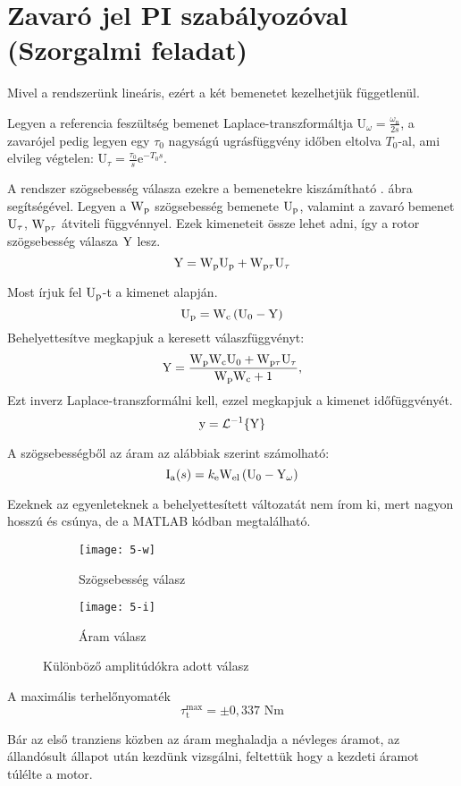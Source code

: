 \section{Zavaró jel PI szabályozóval (Szorgalmi feladat)}\label{sec:szorg-pi}

Mivel a rendszerünk lineáris, ezért a két bemenetet kezelhetjük függetlenül.

Legyen a referencia feszültség bemenet Laplace-transzformáltja
$\mathrm{U}_\omega = \frac{\omega_\text{n}}{2s}$,
a zavarójel pedig legyen egy $\tau_0$ nagyságú ugrásfüggvény időben eltolva $T_0$-al,
ami elvileg végtelen: $\mathrm{U}_\tau=\frac{\tau_0}{s}\text{e}^{-T_0s}$.

A rendszer szögsebesség válasza ezekre a bemenetekre kiszámítható .
ábra segítségével.
Legyen a $\mathrm{W}_\text{p}$ szögsebesség bemenete $\mathrm{U}_\text{p}$, valamint a 
zavaró bemenet $\mathrm{U}_\tau$, $\mathrm{W}_{\text{p}\tau}$ átviteli függvénnyel.
Ezek kimeneteit össze lehet adni, így a rotor szögsebesség válasza $\mathrm{Y}$ lesz.
\begin{equation}
	\mathrm{Y} = \mathrm{W}_\text{p}\mathrm{U}_\text{p} + \mathrm{W}_{\text{p}\tau}\mathrm{U}_\tau
\end{equation}

Most írjuk fel $\mathrm{U}_\text{p}$-t a kimenet alapján.
\begin{equation}
	\mathrm{U}_\text{p} = \mathrm{W}_\text{c}\left(\mathrm{U}_0 - \mathrm{Y}\right)
\end{equation}
%
Behelyettesítve megkapjuk a keresett válaszfüggvényt:
\begin{equation}
	\mathrm{Y} = \frac{\mathrm{W}_\text{p}\mathrm{W}_\text{c}\mathrm{U}_0 + \mathrm{W}_{\text{p}\tau}\mathrm{U}_\tau}{\mathrm{W}_\text{p}\mathrm{W}_\text{c} +1},
\end{equation}
%
Ezt inverz Laplace-transzformálni kell, ezzel megkapjuk a kimenet időfüggvényét.
\begin{equation}
	\mathrm{y} = \mathcal{L}^{-1}\{\mathrm{Y}\}
\end{equation}

A szögsebességből az áram az alábbiak szerint számolható:
\begin{equation}
	\mathrm{I}_\text{a}(s) = k_\text{e}\mathrm{W}_\text{el}\left(\mathrm{U}_0 - \mathrm{Y}_\omega\right)
\end{equation}

Ezeknek az egyenleteknek a behelyettesített változatát nem írom ki, mert
nagyon hosszú és csúnya, de a MATLAB kódban megtalálható.

\begin{figure}[H]
	\centering
	\begin{subfigure}{.49\textwidth}
		\texttt{[image: 5-w]}
		\caption{Szögsebesség válasz}
	\end{subfigure}
	\begin{subfigure}{.49\textwidth}
		\texttt{[image: 5-i]}
		\caption{Áram válasz}
	\end{subfigure}
	\caption{Különböző amplitúdókra adott válasz}
	\label{fig:szorg1}
\end{figure}

A maximális terhelőnyomaték
\begin{equation}
	\tau_\text{t}^\text{max} = \pm0,337\text{ Nm}
\end{equation}

Bár az első tranziens közben az áram meghaladja a névleges áramot, az állandósult állapot
után kezdünk vizsgálni, feltettük hogy a kezdeti áramot túlélte a motor.
